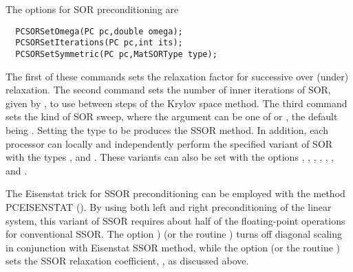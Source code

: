 The options for SOR   
preconditioning are 
\begin{verbatim}
  PCSORSetOmega(PC pc,double omega);
  PCSORSetIterations(PC pc,int its);
  PCSORSetSymmetric(PC pc,MatSORType type);
\end{verbatim}
The  
first of these commands sets the relaxation factor for successive
over (under) relaxation.  The second command sets the number of inner
iterations of SOR, given by , to use between steps of the
Krylov space method.  The third command sets the kind of SOR sweep,
where the argument  can be one of  or , the default
being . Setting the type to be  produces the SSOR method.  In addition, 
each processor can locally and independently perform the specified 
variant of SOR with the types , and .
These  
variants  
can  
also be set with the options , 
, , , 
\break {}, , and 
.
 
 
 

The Eisenstat trick \cite{eisenstat81}  for SSOR preconditioning 
can be employed with the method PCEISENSTAT  
().  
By using both left and right preconditioning of the linear system,
this variant of SSOR requires about half of the floating-point operations 
for conventional SSOR.  
 The option 
\break {}) 
(or the routine )
turns off diagonal scaling in conjunction with Eisenstat SSOR method, while
the option  (or the routine
)
sets the SSOR relaxation coefficient, , as discussed above.
  


